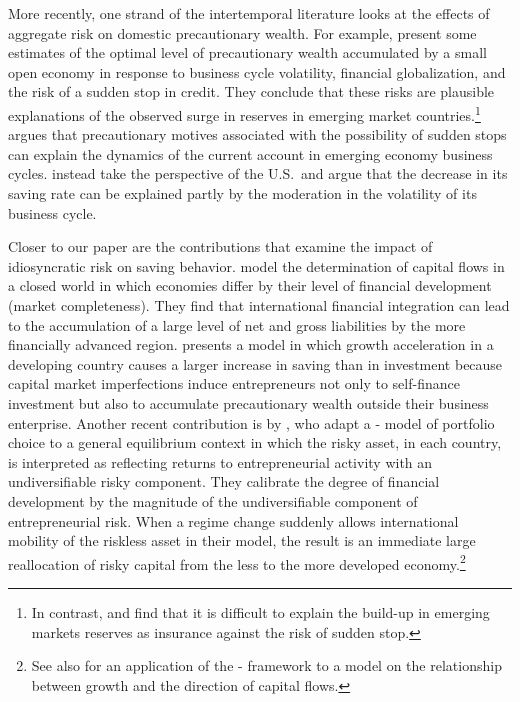 \documentclass[titlepage,abstract,letterpaper]{econtex}
\begin{document}
More recently, one strand of the intertemporal literature looks at the
effects of aggregate risk on domestic precautionary wealth. For
example, \cite{dmtMercant} present some estimates of the optimal level
of precautionary wealth accumulated by a small open economy in
response to business cycle volatility, financial globalization, and
the risk of a sudden stop in credit. They conclude that these risks
are plausible explanations of the observed surge in reserves in
emerging market countries.\footnote{In contrast,
  \cite{JeanneBrookings} and \cite{JRreserves} find that it is
  difficult to explain the build-up in emerging markets reserves as
  insurance against the risk of sudden stop.}  \cite{arbatliThesis}
argues that precautionary motives associated with the possibility of
sudden stops can explain the dynamics of the current account in
emerging economy business cycles.  \cite{fogliPerriMod} instead take
the perspective of the U.S.\ and argue that the decrease in its saving
rate can be explained partly by the moderation in the volatility of
its business cycle.

Closer to our paper are the contributions that examine the impact of
idiosyncratic risk on saving behavior. \cite{mqrImbal} model the
determination of capital flows in a closed world in which economies
differ by their level of financial development (market
completeness). They find that international financial integration can
lead to the accumulation of a large level of net and gross liabilities
by the more financially advanced region. \cite{sandriGrowth}
presents a model in which growth acceleration in a developing country
causes a larger increase in saving than in investment because capital
market imperfections induce entrepreneurs not only to self-finance
investment but also to accumulate precautionary wealth outside their
business enterprise.
Another recent contribution is by \cite{paEntrep}, who adapt a
\cite{merton:restat}-\cite{samuelson:portfolio} model of portfolio
choice to a general equilibrium context in which the risky asset, in
each country, is interpreted as reflecting returns to entrepreneurial activity with an
undiversifiable risky component.  They calibrate the degree of
financial development by the magnitude of the undiversifiable
component of entrepreneurial risk.
When a regime change suddenly allows international mobility of the
riskless asset in their model, the result is an immediate large reallocation of risky
capital from the less to the more developed economy.\footnote{See also \cite{Benhima2013} for an application of the \cite{merton:restat}-\cite{samuelson:portfolio} framework to a model on the relationship between growth and the direction of capital flows.}
\end{document}
